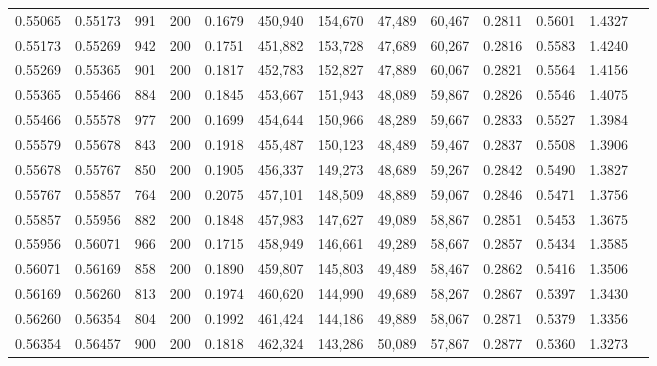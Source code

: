 \begin{tabular}{rrrrrrrrrrrrr}
0.55065 & 0.55173 &   991 & 200 &                                     0.1679 & 450,940 & 154,670 &  47,489 &  60,467 & 0.2811 & 0.5601 & 1.4327 \\
0.55173 & 0.55269 &   942 & 200 &                                     0.1751 & 451,882 & 153,728 &  47,689 &  60,267 & 0.2816 & 0.5583 & 1.4240 \\
0.55269 & 0.55365 &   901 & 200 &                                     0.1817 & 452,783 & 152,827 &  47,889 &  60,067 & 0.2821 & 0.5564 & 1.4156 \\
0.55365 & 0.55466 &   884 & 200 &                                     0.1845 & 453,667 & 151,943 &  48,089 &  59,867 & 0.2826 & 0.5546 & 1.4075 \\
0.55466 & 0.55578 &   977 & 200 &                                     0.1699 & 454,644 & 150,966 &  48,289 &  59,667 & 0.2833 & 0.5527 & 1.3984 \\
0.55579 & 0.55678 &   843 & 200 &                                     0.1918 & 455,487 & 150,123 &  48,489 &  59,467 & 0.2837 & 0.5508 & 1.3906 \\
0.55678 & 0.55767 &   850 & 200 &                                     0.1905 & 456,337 & 149,273 &  48,689 &  59,267 & 0.2842 & 0.5490 & 1.3827 \\
0.55767 & 0.55857 &   764 & 200 &                                     0.2075 & 457,101 & 148,509 &  48,889 &  59,067 & 0.2846 & 0.5471 & 1.3756 \\
0.55857 & 0.55956 &   882 & 200 &                                     0.1848 & 457,983 & 147,627 &  49,089 &  58,867 & 0.2851 & 0.5453 & 1.3675 \\
0.55956 & 0.56071 &   966 & 200 &                                     0.1715 & 458,949 & 146,661 &  49,289 &  58,667 & 0.2857 & 0.5434 & 1.3585 \\
0.56071 & 0.56169 &   858 & 200 &                                     0.1890 & 459,807 & 145,803 &  49,489 &  58,467 & 0.2862 & 0.5416 & 1.3506 \\
0.56169 & 0.56260 &   813 & 200 &                                     0.1974 & 460,620 & 144,990 &  49,689 &  58,267 & 0.2867 & 0.5397 & 1.3430 \\
0.56260 & 0.56354 &   804 & 200 &                                     0.1992 & 461,424 & 144,186 &  49,889 &  58,067 & 0.2871 & 0.5379 & 1.3356 \\
0.56354 & 0.56457 &   900 & 200 &                                     0.1818 & 462,324 & 143,286 &  50,089 &  57,867 & 0.2877 & 0.5360 & 1.3273 \\

\end{tabular}

